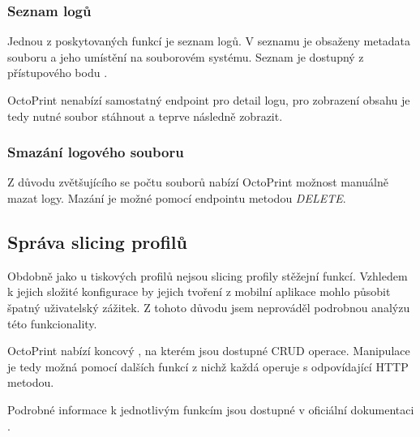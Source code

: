 \subsubsection*{Seznam logů}

Jednou z poskytovaných funkcí je seznam logů.
V seznamu je obsaženy metadata souboru a jeho umístění na souborovém systému.
Seznam je dostupný z přístupového bodu .

OctoPrint nenabízí samostatný endpoint pro detail logu, pro zobrazení obsahu je tedy nutné soubor stáhnout a teprve následně zobrazit.

\subsubsection*{Smazání logového souboru}

Z důvodu zvětšujícího se počtu souborů nabízí OctoPrint možnost manuálně mazat logy.
Mazání je možné pomocí endpointu  metodou \textit{DELETE}.

\subsection{Správa slicing profilů}

Obdobně jako u tiskových profilů nejsou slicing profily stěžejní funkcí.
Vzhledem k jejich složité konfigurace by jejich tvoření z mobilní aplikace mohlo působit špatný uživatelský zážitek.
Z tohoto důvodu jsem neprováděl podrobnou analýzu této funkcionality.

OctoPrint nabízí koncový , na kterém jsou dostupné CRUD operace.
Manipulace je tedy možná pomocí dalších funkcí z nichž každá operuje s odpovídající HTTP metodou.

Podrobné informace k jednotlivým funkcím jsou dostupné v oficiální dokumentaci \cite{octoprint-docs-slicing}.
